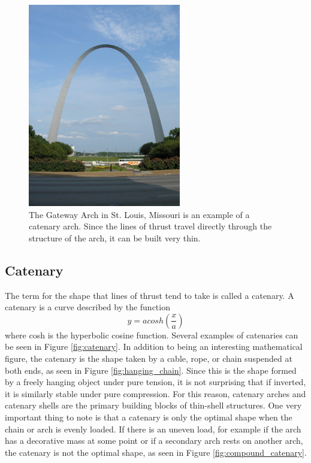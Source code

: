 \documentclass{thesis}
\begin{document}
\begin{figure}
\centering
\includegraphics[height=3.5in]{images/gateway_arch.jpg}
\caption[The Gateway Arch]{The Gateway Arch in St. Louis, Missouri is an example of a catenary arch.  Since the lines of thrust travel directly
through the structure of the arch, it can be built very thin.\footnotemark}
\label{fig:gateway_arch}
\end{figure}

\subsection{Catenary} \label{sec:catenary}
The term for the shape that lines of thrust tend to take is called a catenary.  A catenary is a curve described by the function
\[y=a cosh(\frac{x}{a})\]
where cosh is the hyperbolic cosine function.  Several examples of catenaries can be seen in Figure \ref{fig:catenary}.  In addition to being
an interesting mathematical figure, the catenary is the shape taken by a cable, rope, or chain suspended at both ends, as seen in Figure
\ref{fig:hanging_chain}.  Since this is the shape formed by a freely hanging object under pure tension, it is not surprising that if inverted,
it is similarly stable under pure compression.  For this reason, catenary arches and catenary shells are the primary building blocks of
thin-shell structures.  One very important thing to note is that a catenary is only the optimal shape when the chain or arch is evenly loaded.
If there is an uneven load, for example if the arch has a decorative mass at some point or if a secondary arch rests on another arch, the
catenary is not the optimal shape, as seen in Figure \ref{fig:compound_catenary}.
\end{document}
